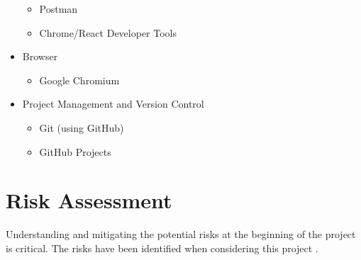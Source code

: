 \begin{itemize}
\begin{itemize}
        \item Postman
        \item Chrome/React Developer Tools
    \end{itemize}
    \item Browser
    \begin{itemize}
        \item Google Chromium
    \end{itemize}
    \item Project Management and Version Control
    \begin{itemize}
        \item Git (using GitHub)
        \item GitHub Projects
    \end{itemize}
\end{itemize}

\section{Risk Assessment}
\label{intro:riskassessment}

Understanding and mitigating the potential risks at the beginning of the project is critical. The risks have been identified when considering this project .

